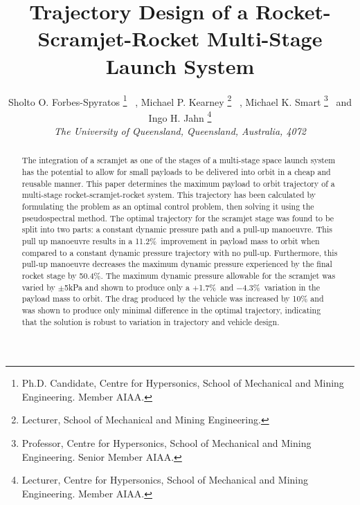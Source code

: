 \documentclass[]{aiaa-tc}
\newcommand{\PayloadImprovement}{11.2\%}
\newcommand{\qDecrease}{50.4\%}
\newcommand{\qVariationPlus}{$+$1.7\%}
\newcommand{\qVariationMinus}{$-$4.3\%}
\begin{document}

\title{Trajectory Design of a Rocket-Scramjet-Rocket Multi-Stage Launch System} %




 \author{
 	Sholto O. Forbes-Spyratos%
 	\thanks{Ph.D. Candidate, Centre for Hypersonics, School of Mechanical and Mining Engineering. Member AIAA.}
 	\ ,  Michael P. Kearney
 	\thanks{Lecturer, School of Mechanical and Mining Engineering.}
 	\ ,  Michael K. Smart
 	\thanks{Professor, Centre for Hypersonics, School of Mechanical and Mining Engineering. Senior Member AIAA.}
 	\ and   Ingo H. Jahn
 	\thanks{Lecturer, Centre for Hypersonics, School of Mechanical and Mining Engineering. Member AIAA.}
 	\\
 	{\normalsize\itshape
 		The University of Queensland, Queensland, Australia, 4072}\\
 }





\begin{abstract}

The integration of a scramjet as one of the stages of a multi-stage space launch system has the potential to allow for small payloads to be delivered into orbit in a cheap and reusable manner. 
This paper determines the maximum payload to orbit trajectory of a multi-stage rocket-scramjet-rocket system. This trajectory has been calculated by formulating the problem as an optimal control problem, then solving it using the pseudospectral method. 
The optimal trajectory for the scramjet stage was found to be split into two parts: a constant dynamic pressure path and a pull-up manoeuvre. This pull up manoeuvre results in a \PayloadImprovement\ improvement in payload mass to orbit when compared to a constant dynamic pressure trajectory with no pull-up. 
Furthermore, this pull-up manoeuvre decreases the maximum dynamic pressure experienced by the final rocket stage by \qDecrease. 
The maximum dynamic pressure allowable for the scramjet was varied by $\pm$5kPa and shown to produce only a \qVariationPlus\ and \qVariationMinus\ variation in the payload mass to orbit. The drag produced by the vehicle was increased by 10\% and was shown to produce only minimal difference in the optimal trajectory, indicating that the solution is robust to variation in trajectory and vehicle design. 


\end{abstract}
\maketitle
\end{document}
